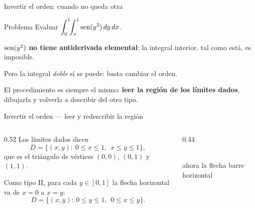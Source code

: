 \documentclass[11pt,aspectratio=169]{beamer}
\begin{document}
\begin{frame}{Invertir el orden: cuando no queda otra}
  \begin{block}{Problema}
    Evaluar $\displaystyle\int_0^1\!\!\int_x^1 \operatorname{sen}(y^2)\,dy\,dx$.
  \end{block}
  \pause
  \vspace{4pt}
  \begin{center}
  \normalsize\color{brick}\textbf{$\operatorname{sen}(y^2)$ no tiene antiderivada elemental}: la integral interior, tal como está, es imposible.
  \end{center}
  \pause
  \vspace{6pt}
  \begin{center}
  \normalsize\color{tealx} Pero la integral \emph{doble} sí se puede: basta cambiar el orden.
  \end{center}
  \pause
  \vspace{6pt}
  \begin{center}\small\color{gray60}
  El procedimiento es siempre el mismo: \textbf{leer la región de los límites dados}, dibujarla y volverla a describir del otro tipo.
  \end{center}
\end{frame}

\begin{frame}{Invertir el orden --- leer y redescribir la región}
  \begin{columns}
    \begin{column}{0.52\textwidth}
      Los límites dados dicen
      \[
        D=\{(x,y):\ 0\le x\le 1,\ \ x\le y\le 1\},
      \]
      que es el triángulo de vértices $(0,0)$, $(0,1)$ y $(1,1)$.
      \pause
      \vspace{6pt}

      Como tipo II, para cada $y\in[0,1]$ la flecha horizontal va de $x=0$ a $x=y$:
      \[
        D=\{(x,y):\ 0\le y\le 1,\ \ 0\le x\le y\}.
      \]
    \end{column}
    \begin{column}{0.44\textwidth}
      \centering
      \\[2pt]
      {\footnotesize\color{gray60} ahora la flecha barre horizontal}
    \end{column}
  \end{columns}
\end{frame}
\end{document}
